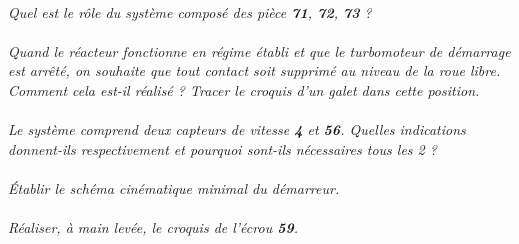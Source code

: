 \documentclass[11pt,oneside]{article}
\begin{document}
\paragraph{}
\textit{Quel est le rôle du système composé des pièce \textbf{71}, \textbf{72}, \textbf{73} ?}

\paragraph{}
\textit{Quand le réacteur fonctionne en régime établi et que le turbomoteur de démarrage est arrêté, on souhaite que tout contact soit supprimé au niveau de la roue libre. Comment cela est-il réalisé ? Tracer le croquis d'un galet dans cette position.}

\paragraph{}
\textit{Le système comprend deux capteurs de vitesse \textbf{4} et \textbf{56}. Quelles indications donnent-ils respectivement et pourquoi sont-ils nécessaires tous les 2 ?}

\paragraph{}
\textit{Établir le schéma cinématique minimal du démarreur. }

\paragraph{}
\textit{Réaliser, à main levée, le croquis de l'écrou \textbf{59}.}
\end{document}
